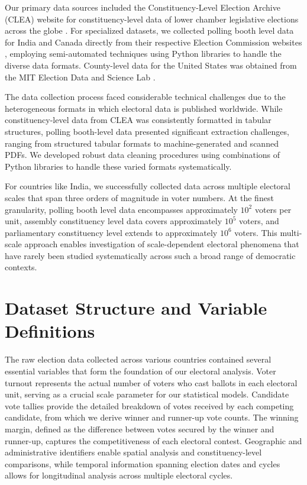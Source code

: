 Our primary data sources included the Constituency-Level Election Archive (CLEA) website for constituency-level data of lower chamber legislative elections across the globe \cite{clea}. For specialized datasets, we collected polling booth level data for India and Canada directly from their respective Election Commission websites \cite{india_data, canada_data}, employing semi-automated techniques using Python libraries to handle the diverse data formats. County-level data for the United States was obtained from the MIT Election Data and Science Lab \cite{DVN/VOQCHQ_2018}.

The data collection process faced considerable technical challenges due to the heterogeneous formats in which electoral data is published worldwide. While constituency-level data from CLEA was consistently formatted in tabular structures, polling booth-level data presented significant extraction challenges, ranging from structured tabular formats to machine-generated and scanned PDFs. We developed robust data cleaning procedures using combinations of Python libraries to handle these varied formats systematically.

For countries like India, we successfully collected data across multiple electoral scales that span three orders of magnitude in voter numbers. At the finest granularity, polling booth level data encompasses approximately $10^2$ voters per unit, assembly constituency level data covers approximately $10^5$ voters, and parliamentary constituency level extends to approximately $10^6$ voters. This multi-scale approach enables investigation of scale-dependent electoral phenomena that have rarely been studied systematically across such a broad range of democratic contexts.

\section{Dataset Structure and Variable Definitions}

The raw election data collected across various countries contained several essential variables that form the foundation of our electoral analysis. Voter turnout represents the actual number of voters who cast ballots in each electoral unit, serving as a crucial scale parameter for our statistical models. Candidate vote tallies provide the detailed breakdown of votes received by each competing candidate, from which we derive winner and runner-up vote counts. The winning margin, defined as the difference between votes secured by the winner and runner-up, captures the competitiveness of each electoral contest. Geographic and administrative identifiers enable spatial analysis and constituency-level comparisons, while temporal information spanning election dates and cycles allows for longitudinal analysis across multiple electoral cycles.

